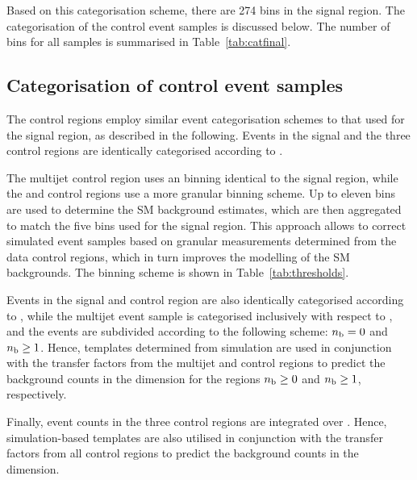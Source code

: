 Based on this categorisation scheme, there are 274 bins in the signal
region. The categorisation of the control event samples is discussed
below. The number of bins for all samples is summarised in
Table~\ref{tab:catfinal}. 


\subsection{Categorisation of control event samples}
\label{sec:categorisationcr}

The control regions employ similar event categorisation schemes to
that used for the signal region, as described in the following. Events
in the signal and the three control regions are identically
categorised according to \njet.

The multijet control region uses an \scalht binning identical to the
signal region, while the \mj and \mmj control regions use a more
granular binning scheme. Up to eleven bins are used to determine the
SM background estimates, which are then aggregated to match the five
\scalht bins used for the signal region.  This approach allows to
correct simulated event samples based on granular measurements
determined from the data control regions, which in turn improves the
modelling of the SM backgrounds. The \scalht binning scheme is shown
in Table~\ref{tab:thresholds}. 

Events in the signal and \mj control region are also identically
categorised according to \nb, while the multijet event sample is
categorised inclusively with respect to \nb, and the \mmj events are
subdivided according to the following scheme: $n_{\text{b}} = 0$ and $n_{\text{b}} \geq
1$. Hence, templates determined from simulation are used in
conjunction with the transfer factors from the multijet and \mmj
control regions to predict the background counts in the \mht
dimension for the regions $n_{\text{b}} \geq 0$ and $n_{\text{b}} \geq 1$, respectively.  

Finally, event counts in the three control regions are integrated over
\mht. Hence, simulation-based templates are also utilised in
conjunction with the transfer factors from all control regions to
predict the background counts in the \mht dimension.


